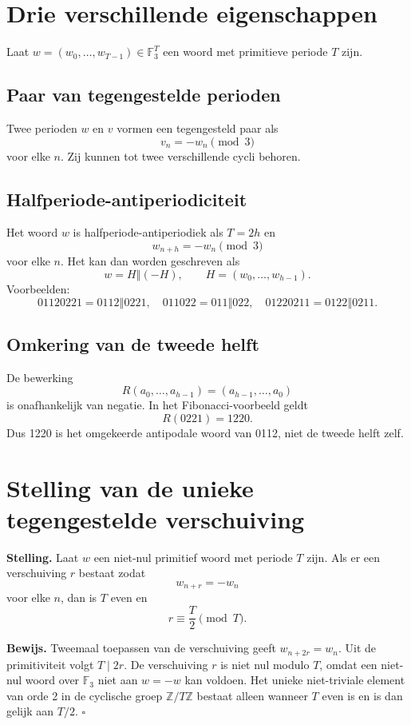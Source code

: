\documentclass[11pt,a4paper]{article}
\newcommand{\F}{\mathbb{F}}
\newcommand{\Z}{\mathbb{Z}}
\newcommand{\oplusword}{\mathbin{\Vert}}
\begin{document}
\section{Drie verschillende eigenschappen}
Laat $w=(w_0,\ldots,w_{T-1})\in\F_3^T$ een woord met primitieve periode $T$ zijn.

\subsection{Paar van tegengestelde perioden}
Twee perioden $w$ en $v$ vormen een tegengesteld paar als
\[
v_n=-w_n\pmod 3
\]
voor elke $n$. Zij kunnen tot twee verschillende cycli behoren.

\subsection{Halfperiode-antiperiodiciteit}
Het woord $w$ is halfperiode-antiperiodiek als $T=2h$ en
\[
w_{n+h}=-w_n\pmod 3
\]
voor elke $n$. Het kan dan worden geschreven als
\[
w=H\oplusword(-H),\qquad H=(w_0,\ldots,w_{h-1}).
\]
Voorbeelden:
\[
01120221=0112\oplusword0221,\quad 011022=011\oplusword022,\quad 01220211=0122\oplusword0211.
\]

\subsection{Omkering van de tweede helft}
De bewerking
\[
R(a_0,\ldots,a_{h-1})=(a_{h-1},\ldots,a_0)
\]
is onafhankelijk van negatie. In het Fibonacci-voorbeeld geldt
\[
R(0221)=1220.
\]
Dus 1220 is het omgekeerde antipodale woord van 0112, niet de tweede helft zelf.

\clearpage
\section{Stelling van de unieke tegengestelde verschuiving}
\textbf{Stelling.} Laat $w$ een niet-nul primitief woord met periode $T$ zijn. Als er een verschuiving $r$ bestaat zodat
\[
w_{n+r}=-w_n
\]
voor elke $n$, dan is $T$ even en
\[
r\equiv \frac{T}{2}\pmod T.
\]

\textbf{Bewijs.} Tweemaal toepassen van de verschuiving geeft $w_{n+2r}=w_n$. Uit de primitiviteit volgt $T\mid 2r$. De verschuiving $r$ is niet nul modulo $T$, omdat een niet-nul woord over $\F_3$ niet aan $w=-w$ kan voldoen. Het unieke niet-triviale element van orde 2 in de cyclische groep $\Z/T\Z$ bestaat alleen wanneer $T$ even is en is dan gelijk aan $T/2$. \hfill$\square$
\end{document}
